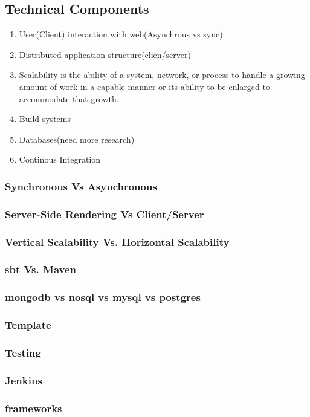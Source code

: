 \subsection{Technical Components}
\begin{enumerate}
	\item User(Client) interaction with web(Asynchrous vs sync)
	\item Distributed application structure(clien/server)
	\item Scalability is the ability of a system, network, or process to handle a growing amount of work in a capable manner or its ability to be enlarged to accommodate that growth.
	\item Build systems
	\item Databases(need more research)
	\item Continous Integration
\end{enumerate}
\subsubsection{Synchronous Vs Asynchronous}
\subsubsection{Server-Side Rendering Vs Client/Server}
\subsubsection{Vertical Scalability Vs. Horizontal Scalability}
\subsubsection{sbt Vs. Maven}
\subsubsection{mongodb vs nosql vs mysql vs postgres}
\subsubsection{Template}
\subsubsection{Testing}
\subsubsection{Jenkins}
\subsubsection{frameworks}


